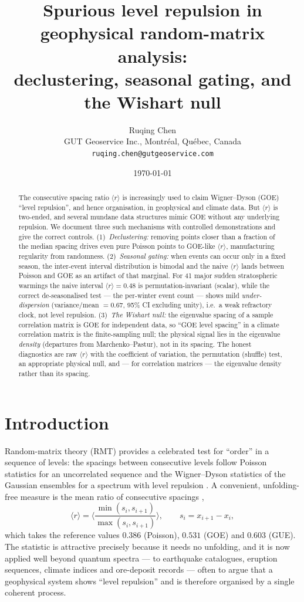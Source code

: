 \documentclass[11pt]{article}
\title{\bfseries Spurious level repulsion in geophysical random-matrix analysis:\\
declustering, seasonal gating, and the Wishart null}
\author{Ruqing Chen\\[2pt]
\small GUT Geoservice Inc., Montr\'eal, Qu\'ebec, Canada\\
\small \texttt{ruqing.chen@gutgeoservice.com}}
\date{\today}
\newcommand{\rr}{\langle r\rangle}
\begin{document}
\maketitle

\begin{abstract}
\noindent
The consecutive spacing ratio $\rr$ is increasingly used to claim Wigner--Dyson
(GOE) ``level repulsion'', and hence organisation, in geophysical and climate
data. But $\rr$ is two-ended, and several mundane data structures mimic GOE
without any underlying repulsion. We document three such mechanisms with
controlled demonstrations and give the correct controls. (1)~\emph{Declustering:}
removing points closer than a fraction of the median spacing drives even pure
Poisson points to GOE-like $\rr$, manufacturing regularity from randomness.
(2)~\emph{Seasonal gating:} when events can occur only in a fixed season, the
inter-event interval distribution is bimodal and the naive $\rr$ lands between
Poisson and GOE as an artifact of that marginal. For 41 major sudden
stratospheric warmings the naive interval $\rr=0.48$ is permutation-invariant
(scalar), while the correct de-seasonalised test --- the per-winter event count
--- shows mild \emph{under-dispersion} (variance/mean $=0.67$, 95\% CI excluding
unity), i.e.\ a weak refractory clock, not level repulsion. (3)~\emph{The Wishart
null:} the eigenvalue spacing of a sample correlation matrix is GOE for
independent data, so ``GOE level spacing'' in a climate correlation matrix is the
finite-sampling null; the physical signal lies in the eigenvalue \emph{density}
(departures from Marchenko--Pastur), not in its spacing. The honest diagnostics
are raw $\rr$ with the coefficient of variation, the permutation (shuffle) test,
an appropriate physical null, and --- for correlation matrices --- the eigenvalue
density rather than its spacing.
\end{abstract}

\section{Introduction}

Random-matrix theory (RMT) provides a celebrated test for ``order'' in a
sequence of levels: the spacings between consecutive levels follow Poisson
statistics for an uncorrelated sequence and the Wigner--Dyson statistics of the
Gaussian ensembles for a spectrum with level repulsion \citep{mehta2004}. A
convenient, unfolding-free measure is the mean ratio of consecutive spacings
\citep{oganesyan2007,atas2013},
\begin{equation}
\rr = \Big\langle \frac{\min(s_i,s_{i+1})}{\max(s_i,s_{i+1})}\Big\rangle,
\qquad s_i = x_{i+1}-x_i,
\label{eq:r}
\end{equation}
which takes the reference values $0.386$ (Poisson), $0.531$ (GOE) and $0.603$
(GUE). The statistic is attractive precisely because it needs no unfolding, and
it is now applied well beyond quantum spectra --- to earthquake catalogues,
eruption sequences, climate indices and ore-deposit records --- often to argue
that a geophysical system shows ``level repulsion'' and is therefore organised by
a single coherent process.
\end{document}
